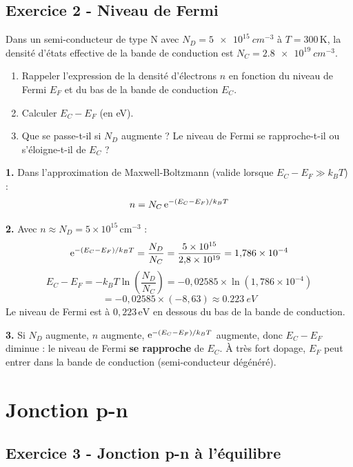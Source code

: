 \documentclass[12pt,a4paper]{article}
\begin{document}
\subsection*{Exercice 2 - Niveau de Fermi \niveau{\moyen}}

\begin{boiteexercice}
Dans un semi-conducteur de type N avec $N_D = \qty{5e15}{cm^{-3}}$ à $T=300$\,K, la densité d'états effective de la bande de conduction est $N_C = \qty{2.8e19}{cm^{-3}}$.
\begin{enumerate}
  \item Rappeler l'expression de la densité d'électrons $n$ en fonction du niveau de Fermi $E_F$ et du bas de la bande de conduction $E_C$.
  \item Calculer $E_C - E_F$ (en eV).
  \item Que se passe-t-il si $N_D$ augmente ? Le niveau de Fermi se rapproche-t-il ou s'éloigne-t-il de $E_C$ ?
\end{enumerate}
\end{boiteexercice}

\begin{boitecorrige}
\textbf{1.} Dans l'approximation de Maxwell-Boltzmann (valide lorsque $E_C-E_F\gg k_BT$) :
\[
n = N_C\,\mathrm{e}^{-(E_C-E_F)/k_BT}
\]

\textbf{2.} Avec $n\approx N_D = 5\times10^{15}\,\text{cm}^{-3}$ :
\[
\mathrm{e}^{-(E_C-E_F)/k_BT} = \frac{N_D}{N_C} = \frac{5\times10^{15}}{2{,}8\times10^{19}} = 1{,}786\times10^{-4}
\]
\[
E_C - E_F = -k_BT\ln\!\left(\frac{N_D}{N_C}\right) = -0{,}02585\times\ln(1{,}786\times10^{-4})
\]
\[
= -0{,}02585\times(-8{,}63) \approx \qty{0.223}{eV}
\]
Le niveau de Fermi est à $0{,}223\,\text{eV}$ en dessous du bas de la bande de conduction.

\textbf{3.} Si $N_D$ augmente, $n$ augmente, $\mathrm{e}^{-(E_C-E_F)/k_BT}$ augmente, donc $E_C-E_F$ diminue : le niveau de Fermi \textbf{se rapproche} de $E_C$. À très fort dopage, $E_F$ peut entrer dans la bande de conduction (semi-conducteur dégénéré).
\end{boitecorrige}

\section{Jonction p-n}

\subsection*{Exercice 3 - Jonction p-n à l'équilibre \niveau{\moyen}}
\end{document}
